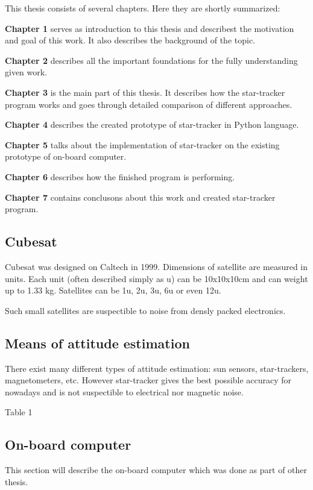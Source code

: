 \documentclass[12pt,a4paper,oneside]{article}
\begin{document}
This thesis consists of several chapters. Here they are shortly summarized:\par
\setlength{\parindent}{0cm}
\textbf{Chapter 1} serves as introduction to this thesis and describest the motivation and goal of this work. It also describes the background of the topic.\par
\textbf{Chapter 2} describes all the important foundations for the fully understanding given work.\par
\textbf{Chapter 3} is the main part of this thesis. It describes how the star-tracker program works and goes through detailed comparison of different approaches.\par
\textbf{Chapter 4} describes the created prototype of star-tracker in Python language.\par
\textbf{Chapter 5} talks about the implementation of star-tracker on the existing prototype of on-board computer.\par
\textbf{Chapter 6} describes how the finished program is performing.\par
\textbf{Chapter 7} contains conclusons about this work and created star-tracker program.\par

\setlength{\parindent}{1cm}

\subsection{Cubesat}
Cubesat was designed on Caltech in 1999.
Dimensions of satellite are measured in units. Each unit (often described simply as u) can be 10x10x10cm and can weight up to 1.33 kg. Satellites can be 1u, 2u, 3u, 6u or even 12u.

Such small satellites are suspectible to noise from densly packed electronics.

\subsection{Means of attitude estimation}

There exist many different types of attitude estimation: sun sensors, star-trackers, magnetometers, etc. However star-tracker gives the best possible accuracy for nowadays and is not suspectible to electrical nor magnetic noise.

Table 1

\subsection{On-board computer}
This section will describe the on-board computer which was done as part of other thesis.
\end{document}
